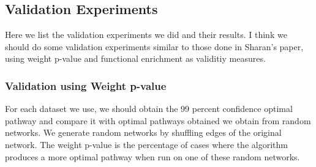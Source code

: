 \documentclass{ws-procs11x85}
\begin{document}
\begin{figure}[h]
\centering
{}
\end{figure}

\subsection{Validation Experiments}
Here we list the validation experiments we did and their results. I think we
should do some validation experiments similar to those done in Sharan's paper,
using weight p-value and functional enrichment as validitiy measures.

\subsubsection{Validation using Weight p-value}
For each dataset we use, we should obtain the 99 percent confidence optimal
pathway and compare it with optimal pathways obtained we obtain from random
networks. We generate random networks by shuffling edges of the original
network. The weight p-value is the percentage of cases where the algorithm
produces a more optimal pathway when run on one of these random networks.
\end{document}
